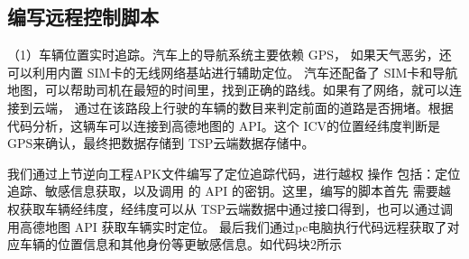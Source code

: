\subsection{编写远程控制脚本}
（1）车辆位置实时追踪。汽车上的导航系统主要依赖 GPS，
如果天气恶劣，还可以利用内置 SIM卡的无线网络基站进行辅助定位。
汽车还配备了 SIM卡和导航地图，可以帮助司机在最短的时间里，找到正确的路线。如果有了网络，就可以连接到云端，
通过在该路段上行驶的车辆的数目来判定前面的道路是否拥堵。根据代码分析，这辆车可以连接到高德地图的 API。这个 ICV的位置经纬度判断是
GPS来确认，最终把数据存储到 TSP云端数据存储中。

我们通过上节逆向工程APK文件编写了定位追踪代码，进行越权
操作 包括：定位追踪、敏感信息获取，以及调用
的 API 的密钥。这里，编写的脚本首先
需要越权获取车辆经纬度，经纬度可以从 TSP云端数据中通过接口得到，也可以通过调用高德地图 API 获取车辆实时定位。
最后我们通过pc电脑执行代码远程获取了对应车辆的位置信息和其他身份等更敏感信息。如代码块2所示

